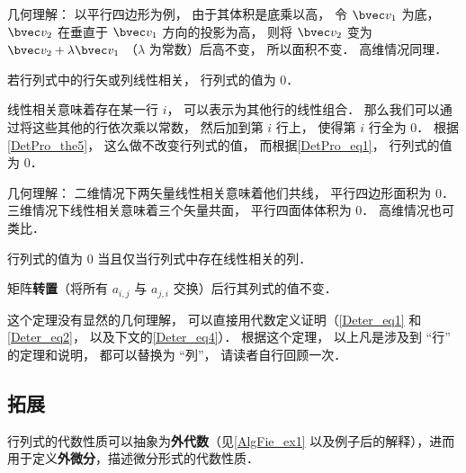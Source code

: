 几何理解： 以平行四边形为例， 由于其体积是底乘以高， 令 $\bvec v_1$ 为底， $\bvec v_2$ 在垂直于 $\bvec v_1$ 方向的投影为高， 则将 $\bvec v_2$ 变为 $\bvec v_2 + \lambda \bvec v_1$ （$\lambda$ 为常数）后高不变， 所以面积不变． 高维情况同理．

\begin{theorem}{ }
若行列式中的行矢或列线性相关， 行列式的值为 0．
\end{theorem}
线性相关意味着存在某一行 $i$， 可以表示为其他行的线性组合． 那么我们可以通过将这些其他的行依次乘以常数， 然后加到第 $i$ 行上， 使得第 $i$ 行全为 0． 根据\autoref{DetPro_the5}， 这么做不改变行列式的值， 而根据\autoref{DetPro_eq1}， 行列式的值为 0．

几何理解： 二维情况下两矢量线性相关意味着他们共线， 平行四边形面积为 0． 三维情况下线性相关意味着三个矢量共面， 平行四面体体积为 0． 高维情况也可类比．

\begin{theorem}{ } \label{DetPro_the2}
行列式的值为 0 当且仅当行列式中存在线性相关的列．
\end{theorem}

\begin{theorem}{ }\label{DetPro_the7}
矩阵\textbf{转置}（将所有 $a_{i,j}$ 与 $a_{j,i}$ 交换）后行其列式的值不变．
\end{theorem}
这个定理没有显然的几何理解， 可以直接用代数定义证明（\autoref{Deter_eq1} 和\autoref{Deter_eq2}， 以及下文的\autoref{Deter_eq4}）． 根据这个定理， 以上凡是涉及到 “行” 的定理和说明， 都可以替换为 “列”， 请读者自行回顾一次．

\subsection{拓展}

行列式的代数性质可以抽象为\textbf{外代数}（见\autoref{AlgFie_ex1} 以及例子后的解释），进而用于定义\textbf{外微分}，描述微分形式的代数性质．

